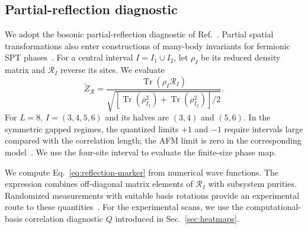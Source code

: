 \subsection{Partial-reflection diagnostic}

We adopt the bosonic partial-reflection diagnostic of Ref.~\cite{elben2020manybody}.
Partial spatial transformations also enter constructions of many-body invariants for fermionic SPT phases~\cite{shiozaki2017manybody}.
For a central interval $I=I_1\cup I_2$, let $\rho_I$ be its reduced density matrix and $\mathcal R_I$ reverse its sites. We evaluate
\begin{equation}
\tilde Z_{\mathcal R}
=\frac{\operatorname{Tr}(\rho_I\mathcal R_I)}
{\sqrt{\left[\operatorname{Tr}(\rho_{I_1}^2)
+\operatorname{Tr}(\rho_{I_2}^2)\right]/2}}.
\label{eq:reflection-marker}
\end{equation}
For $L=8$, $I=(3,4,5,6)$ and its halves are $(3,4)$ and $(5,6)$.
In the symmetric gapped regimes, the quantized limits $+1$ and $-1$ require intervals large compared with the correlation length; the AFM limit is zero in the corresponding model~\cite{elben2020manybody}.
We use the four-site interval to evaluate the finite-size phase map.

We compute Eq.~\eqref{eq:reflection-marker} from numerical wave functions.
The expression combines off-diagonal matrix elements of $\mathcal R_I$ with subsystem purities.
Randomized measurements with suitable basis rotations provide an experimental route to these quantities~\cite{elben2022toolbox}.
For the experimental scans, we use the computational-basis correlation diagnostic $Q$ introduced in Sec.~\ref{sec:heatmaps}.
